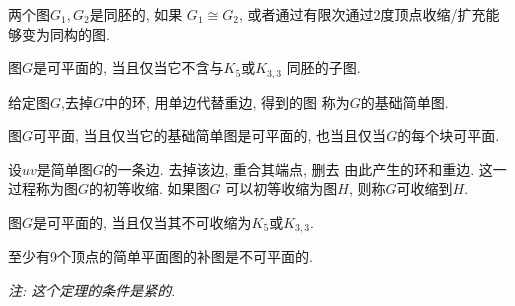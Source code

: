 \begin{definition}[同胚]
    两个图\(G_1,G_2\)是同胚的, 如果 \(G_1 \cong G_2\),
    或者通过有限次通过2度顶点收缩/扩充能够变为同构的图.
\end{definition}

\begin{theorem}[Kuratowski]
    图\(G\)是可平面的, 当且仅当它不含与\(K_5\)或\(K_{3,3}\)
    同胚的子图.
\end{theorem}

\begin{definition}[基础简单图]
    给定图\(G\),去掉\(G\)中的环, 用单边代替重边, 得到的图
    称为\(G\)的基础简单图.
\end{definition}

\begin{theorem}
    图\(G\)可平面, 当且仅当它的基础简单图是可平面的,
    也当且仅当\(G\)的每个块可平面.
\end{theorem}

\begin{definition}
    设\(uv\)是简单图\(G\)的一条边. 去掉该边, 重合其端点, 删去
    由此产生的环和重边. 这一过程称为图\(G\)的初等收缩. 如果图\(G\)
    可以初等收缩为图\(H\), 则称\(G\)可收缩到\(H\).
\end{definition}

\begin{theorem}[Wagner]
    图\(G\)是可平面的, 当且仅当其不可收缩为\(K_5\)或\(K_{3,3}\).
\end{theorem}

\begin{theorem}
    至少有9个顶点的简单平面图的补图是不可平面的.

    \textit{注: 这个定理的条件是紧的}.
\end{theorem}
